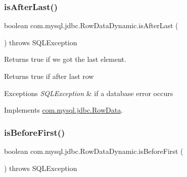\mbox{\label{classcom_1_1mysql_1_1jdbc_1_1_row_data_dynamic_aeb4bc5a55d234a0c4af074cd0d32b352}} 
\subsubsection{\texorpdfstring{is\+After\+Last()}{isAfterLast()}}
{\footnotesize\ttfamily boolean com.\+mysql.\+jdbc.\+Row\+Data\+Dynamic.\+is\+After\+Last (\begin{DoxyParamCaption}{ }\end{DoxyParamCaption}) throws S\+Q\+L\+Exception}

Returns true if we got the last element.

\begin{DoxyReturn}{Returns}
true if after last row 
\end{DoxyReturn}

\begin{DoxyExceptions}{Exceptions}
{\em S\+Q\+L\+Exception} & if a database error occurs \\
\hline
\end{DoxyExceptions}


Implements \mbox{\hyperlink{interfacecom_1_1mysql_1_1jdbc_1_1_row_data_ab19688b6d0fbdc4e9b7589e099f28ff7}{com.\+mysql.\+jdbc.\+Row\+Data}}.

\mbox{\label{classcom_1_1mysql_1_1jdbc_1_1_row_data_dynamic_a6cfc796696d9202761004405808df049}} 
\subsubsection{\texorpdfstring{is\+Before\+First()}{isBeforeFirst()}}
{\footnotesize\ttfamily boolean com.\+mysql.\+jdbc.\+Row\+Data\+Dynamic.\+is\+Before\+First (\begin{DoxyParamCaption}{ }\end{DoxyParamCaption}) throws S\+Q\+L\+Exception}

